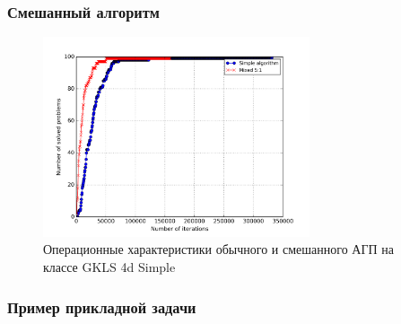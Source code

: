 \documentclass[aspectratio=1610]{beamer}
\begin{document}
\begin{frame}
  \frametitle{Смешанный алгоритм}
  \begin{figure}
    \center
      \includegraphics[width=0.7\textwidth]{mixed_op4d.png}
      \caption*{Операционные характеристики обычного и смешанного АГП на классе GKLS 4d Simple}
  \end{figure}
\end{frame}

\begin{frame}
  \frametitle{Пример прикладной задачи}
\end{frame}
\end{document}

